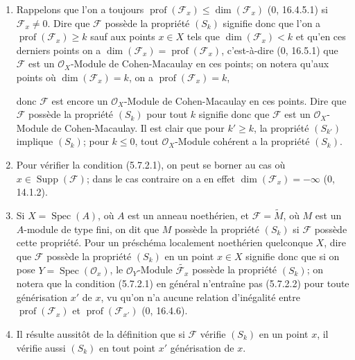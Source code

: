 \begin{remarks}[5.7.3]
\label{IV.2.s5.7.3-fr}
\begin{enumerate}
\item[(i)] Rappelons que l'on a toujours
$\operatorname{prof}(\mathscr F_x)\leq\dim(\mathscr F_x)$ (0, 16.4.5.1)
si $\mathscr F_x\neq0$. Dire que $\mathscr F$ possède la propriété $(S_k)$
signifie donc que l'on a $\operatorname{prof}(\mathscr F_x)\geq k$ sauf aux
points $x\in X$ tels que $\dim(\mathscr F_x)<k$ et qu'en ces derniers points
on a $\dim(\mathscr F_x)=\operatorname{prof}(\mathscr F_x)$, c'est-à-dire
(0, 16.5.1) que $\mathscr F$ est un $\mathcal O_X$-Module de
Cohen-Macaulay en ces points; on notera qu'aux points où
$\dim(\mathscr F_x)=k$, on a $\operatorname{prof}(\mathscr F_x)=k$,


donc $\mathscr F$ est encore un $\mathcal O_X$-Module de Cohen-Macaulay en
ces points. Dire que $\mathscr F$ possède la propriété $(S_k)$ pour tout
$k$ signifie donc que $\mathscr F$ est un $\mathcal O_X$-Module de
Cohen-Macaulay. Il est clair que pour $k'\geq k$, la propriété $(S_{k'})$
implique $(S_k)$; pour $k\leq0$, tout $\mathcal O_X$-Module cohérent a la
propriété $(S_k)$.

\item[(ii)] Pour vérifier la condition (5.7.2.1), on peut se borner au cas
où $x\in\operatorname{Supp}(\mathscr F)$; dans le cas contraire on a en
effet $\dim(\mathscr F_x)=-\infty$ (0, 14.1.2).

\item[(iii)] Si $X=\operatorname{Spec}(A)$, où $A$ est un anneau
noethérien, et $\mathscr F=\widetilde M$, où $M$ est un $A$-module de type
fini, on dit que $M$ possède la propriété $(S_k)$ si $\mathscr F$ possède
cette propriété. Pour un préschéma localement noethérien quelconque $X$,
dire que $\mathscr F$ possède la propriété $(S_k)$ en un point $x\in X$
signifie donc que si on pose $Y=\operatorname{Spec}(\mathcal O_x)$, le
$\mathcal O_Y$-Module $\widetilde{\mathscr F_x}$ possède la propriété
$(S_k)$; on notera que la condition (5.7.2.1) en général n'entraîne pas
(5.7.2.2) pour toute générisation $x'$ de $x$, vu qu'on n'a aucune relation
d'inégalité entre $\operatorname{prof}(\mathscr F_x)$ et
$\operatorname{prof}(\mathscr F_{x'})$ (0, 16.4.6).

\item[(iv)] Il résulte aussitôt de la définition que si $\mathscr F$ vérifie
$(S_k)$ en un point $x$, il vérifie aussi $(S_k)$ en tout point $x'$
générisation de $x$.


\end{enumerate}
\end{remarks}
